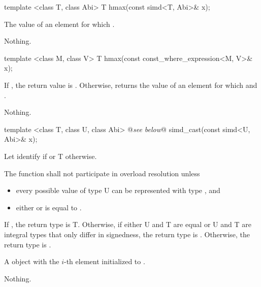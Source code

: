 \begin{itemdecl}
template <class T, class Abi> T hmax(const simd<T, Abi>& x);
\end{itemdecl}
\begin{itemdescr}
  \pnum\returns The value of an element  for which  \foralli.

  \pnum\throws Nothing.
\end{itemdescr}

\begin{itemdecl}
template <class M, class V> T hmax(const const_where_expression<M, V>& x);
\end{itemdecl}
\begin{itemdescr}
  \pnum\returns If , the return value is .
  Otherwise, returns the value of an element  for which  and  \foralli.

  \pnum\throws Nothing.
\end{itemdescr}


\begin{itemdecl}
  template <class T, class U, class Abi> @\emph{see below}@ simd_cast(const simd<U, Abi>& x);
\end{itemdecl}
\begin{itemdescr}
  \pnum\remarks Let  identify  if  or \type T otherwise.

  \pnum\remarks The function shall not participate in overload resolution unless
  \begin{itemize}
    \item every possible value of type \type U can be represented with type , and
    \item either  or  is equal to .
  \end{itemize}

  \pnum\remarks If , the return type is \type T.
  Otherwise, if either \type U and \type T are equal or \type U and \type T are integral types that only differ in signedness, the return type is \simd[<T, Abi>].
  Otherwise, the return type is .

  \pnum\returns A \simd object with the $i$-th element initialized to .

  \pnum\throws Nothing.
\end{itemdescr}


